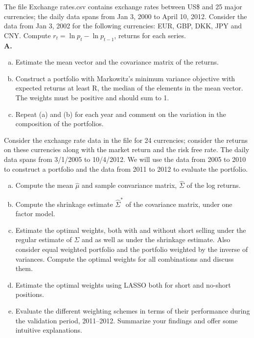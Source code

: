     
\prob The file Exchange rates.csv contains exchange rates between US\$ and 25 major currencies; the daily data spans from Jan 3, 2000 to April 10, 2012. Consider the data from Jan 3, 2002 for the following currencies: EUR, GBP, DKK, JPY and CNY. Compute $r_t = \ln{p_t} - \ln{p_{t-1}}$, returns for each series. \\

\indent\textbf{A. }\begin{minipage}[t]{0.8\linewidth}
	\begin{enumerate}[(a)]
	\item Estimate the mean vector and the covariance matrix of the returns.
	\item Construct a portfolio with Markowitz's minimum variance objective with expected returns at least R, the median of the elements in the mean vector. The weights must be positive and should sum to 1.
	\item Repeat (a) and (b) for each year and comment on the variation in the composition of the portfolios. \twomedskip
	\end{enumerate}
	\end{minipage}


\prob Consider the exchange rate data in the file  for 24 currencies; consider the returns on these currencies along with the market return and the risk free rate. The daily data spans from 3/1/2005 to 10/4/2012. We will use the data from 2005 to 2010 to construct a portfolio and the data from 2011 to 2012 to evaluate the portfolio.
	\begin{enumerate}[(a)]
	\item Compute the mean $\hat{\mu}$ and sample convariance matrix, $\hat{\Sigma}$ of the log returns.
	\item Compute the shrinkage estimate $\hat{\Sigma}^*$ of the covariance matrix, under one factor model.
	\item Estimate the optimal weights, both with and without short selling under the regular estimate of $\Sigma$ and as well as under the shrinkage estimate. Also consider equal weighted portfolio and the portfolio weighted by the inverse of variances. Compute the optimal weights for all combinations and discuss them.
	\item Estimate the optimal weights using LASSO both for short and no-short positions.
	\item Evaluate the different weighting schemes in terms of their performance during the validation period, 2011--2012. Summarize your findings and offer some intuitive explanations. \twomedskip
	\end{enumerate}


